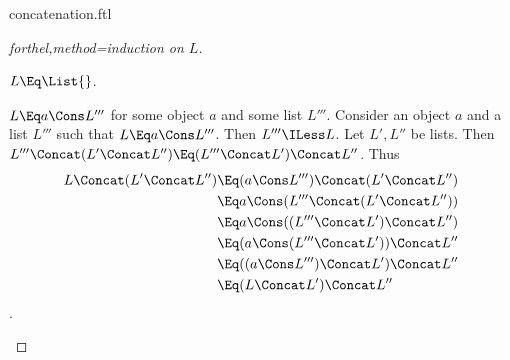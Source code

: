 \documentclass{stex}
\begin{document}
\begin{smodule}{concatenation.ftl}
\begin{proof}[forthel,method=induction on $L$]
  \begin{case}{$L \Eq \List{}$.} \end{case}

  \begin{case}{$L \Eq a \Cons L'''$ for some object $a$ and some list $L'''$.}
    Consider an object $a$ and a list $L'''$ such that $L \Eq a \Cons L'''$.
    Then $L''' \ILess L$.
    Let $L',L''$ be lists.
    Then $L''' \Concat (L' \Concat L'') \Eq (L''' \Concat L') \Concat L''$.
    Thus
    \begin{align*}
      L \Concat (L' \Concat L'') 
        &\Eq (a \Cons L''') \Concat (L' \Concat L'')\\
        &\Eq a \Cons (L''' \Concat (L' \Concat L''))\\
        &\Eq a \Cons ((L''' \Concat L') \Concat L'')\\
        &\Eq (a \Cons (L''' \Concat L')) \Concat L''\\
        &\Eq ((a \Cons L''') \Concat L') \Concat L''\\
        &\Eq (L \Concat L') \Concat L''
    \end{align*}.
  \end{case}
\end{proof}

\end{smodule}
\end{document}
